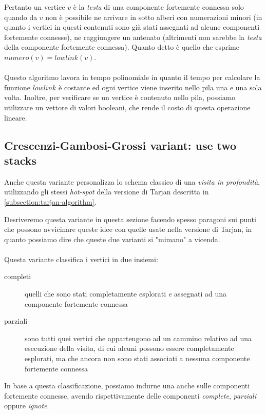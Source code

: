 Pertanto un vertice $v$ \`e la \emph{testa} di una componente
fortemente connessa solo quando da $v$ non \`e possibile ne arrivare
in sotto alberi con numerazioni minori (in quanto i vertici in questi
contenuti sono gi\`a stati assegnati ad alcune componenti fortemente
connesse), ne raggiungere un antenato (altrimenti non sarebbe la
\emph{testa} della componente fortemente connessa). Quanto detto \`e
quello che esprime $numero(v) = lowlink(v)$.
\\\\
Questo algoritmo lavora in tempo polinomiale in quanto il tempo per
calcolare la funzione $lowlink$ \`e costante ed ogni vertice viene
inserito nello pila una e una sola volta. Inoltre, per verificare se
un vertice \`e contenuto nello pila, possiamo utilizzare un vettore di
valori booleani, che rende il costo di questa operazione lineare.

\subsection{Crescenzi-Gambosi-Grossi variant: use two stacks}
\label{subsection:crescenzi-gambosi-grossi}
Anche questa variante personalizza lo schema classico di una
\emph{visita in profondit\`a}, utilizzando gli stessi \emph{hot-spot}
della versione di Tarjan descritta in
\ref{subsection:tarjan-algorithm}. 

Desriveremo questa variante in questa sezione facendo spesso paragoni
sui punti che possono avvicinare queste idee con quelle usate nella
versione di Tarjan, in quanto possiamo dire che queste due varianti si
"mimano" a vicenda.
\\\\
Questa variante classifica i vertici in due insiemi:
\begin{description}
\item[completi] quelli che sono stati completamente esplorati \emph{e}
  assegnati ad una componente fortemente connessa
\item[parziali] sono tutti quei vertici che appartengono ad un cammino
  relativo ad una esecuzione della visita, di cui alcuni possono
  essere completamente esplorati, ma che ancora non sono stati
  associati a nessuna componente fortemente connessa
\end{description}
In base a questa classificazione, possiamo indurne una anche sulle
componenti fortemente connesse, avendo rispettivamente delle
componenti \emph{complete}, \emph{parziali} oppure \emph{ignote}.

